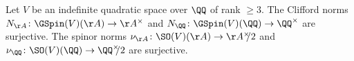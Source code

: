 \begin{lemma}\label{lem:surjectivity_spinor}
    Let $V$ be an indefinite quadratic space over $\QQ$ of rank $\geq 3$. The Clifford norms $N_{\AA}\colon \GSpin(V)(\AA) \rightarrow \AA^{\times}$ and $N_{\QQ}\colon \GSpin(V)(\QQ) \rightarrow \QQ^{\times}$ are surjective. The spinor norms $\nu_{\AA}\colon \SO(V)(\AA) \rightarrow \AA^{\times}\hspace{-4pt}/2$ and $\nu_{\QQ}\colon \SO(V)(\QQ) \rightarrow \QQ^{\times} \hspace{-4pt}/2$ are surjective.
\end{lemma}
